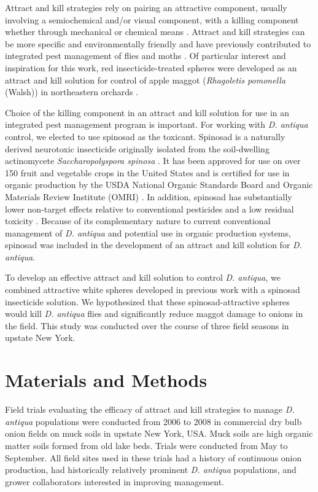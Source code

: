 \documentclass[alpha-refs]{wiley-article}
\begin{document}
Attract and kill strategies rely on pairing an attractive component, usually involving a semiochemical and/or visual component, with a killing component whether through mechanical or chemical means \citep{gregg2018advances}.  Attract and kill strategies can be more specific and environmentally friendly and have previously contributed to integrated pest management of flies and moths \citep{gregg2018advances}.  Of particular interest and inspiration for this work, red insecticide-treated spheres were developed as an attract and kill solution for control of apple maggot (\textit{Rhagoletis pomonella} (Walsh)) in northeastern orchards \citep{bostanian2001attract,duan1995control}.  

Choice of the killing component in an attract and kill solution for use in an integrated pest management program is important. For working with \textit{D. antiqua} control, we elected to use spinosad as the toxicant. Spinosad is a naturally derived neurotoxic insecticide originally isolated from the soil-dwelling actinomycete \textit{Saccharopolyspora spinosa} \citep{racke2007reduced}. It has been approved for use on over 150 fruit and vegetable crops in the United States and is certified for use in organic production by the USDA National Organic Standards Board and Organic Materials Review Institute (OMRI) \citep{racke2007reduced,williams2003naturally}. In addition, spinosad has substantially lower non-target effects relative to conventional pesticides and a low residual toxicity \citep{williams2003naturally}. Because of its complementary nature to current conventional management of \textit{D. antiqua} and potential use in organic production systems, spinosad was included in the development of an attract and kill solution for \textit{D. antiqua}.

To develop an effective attract and kill solution to control \textit{D. antiqua}, we combined attractive white spheres developed in previous work \citep{willett2019} with a spinosad insecticide solution. We hypothesized that these spinosad-attractive spheres would kill \textit{D. antiqua} flies and significantly reduce maggot damage to onions in the field. This study was conducted over the course of three field seasons in upstate New York.

\section{Materials and Methods}

Field trials evaluating the efficacy of attract and kill strategies to manage \textit{D. antiqua} populations were conducted from 2006 to 2008 in commercial dry bulb onion fields on muck soils in upstate New York, USA.  Muck soils are high organic matter soils formed from old lake beds.  Trials were conducted from May to September.  All field sites used in these trials had a history of continuous onion production, had historically relatively prominent \textit{D. antiqua} populations, and grower collaborators interested in improving management.  
\end{document}
